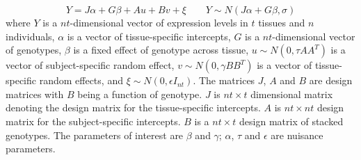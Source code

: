 \documentclass[hidelinks]{article}
\begin{document}
\begin{equation}
Y = J\alpha + G\beta + Au + Bv + \xi \qquad Y \sim N\left(J\alpha + G\beta, \sigma\right)
\end{equation}
where $Y$ is a $nt$-dimensional vector of expression levels in $t$ tissues and $n$ individuals, $\alpha$ is a vector of tissue-specific intercepts, $G$ is a $nt$-dimensional vector of genotypes, $\beta$ is a fixed effect of genotype across tissue, $u \sim N\left(0, \tau AA^T \right)$ is a vector of subject-specific random effect, $v \sim N\left(0,\gamma BB^T \right)$ is a vector of tissue-specific random effects, and $\xi \sim N\left(0, \epsilon I_{nt} \right)$. The matrices $J$, $A$ and $B$ are design matrices with $B$ being a function of genotype. $J$ is $nt \times t$ dimensional matrix denoting the design matrix for the tissue-specific intercepts. $A$ is $nt \times nt$ design matrix for the subject-specific intercepts. $B$ is a $nt \times t$ design matrix of stacked genotypes. The parameters of interest are $\beta$ and $\gamma$; $\alpha$, $\tau$ and $\epsilon$ are nuisance parameters.
\end{document}
